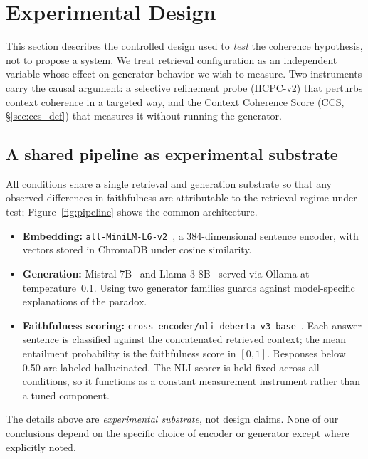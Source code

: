 \section{Experimental Design}
\label{sec:method}

This section describes the controlled design used to \emph{test} the
coherence hypothesis, not to propose a system. We treat retrieval
configuration as an independent variable whose effect on generator
behavior we wish to measure. Two instruments carry the causal argument:
a selective refinement probe (HCPC-v2) that perturbs context coherence
in a targeted way, and the Context Coherence Score (CCS,
\S\ref{sec:ccs_def}) that measures it without running the generator.

\subsection{A shared pipeline as experimental substrate}
\label{sec:shared}


All conditions share a single retrieval and generation substrate so that
any observed differences in faithfulness are attributable to the retrieval
regime under test; Figure~\ref{fig:pipeline} shows the common architecture.

\begin{itemize}
  \item \textbf{Embedding:}
        \texttt{all-MiniLM-L6-v2}~\citep{reimers2019sbert}, a 384-dimensional
        sentence encoder, with vectors stored in ChromaDB under cosine
        similarity.
  \item \textbf{Generation:} Mistral-7B~\citep{jiang2023mistral} and
        Llama-3-8B~\citep{llama3} served via Ollama at temperature~0.1.
        Using two generator families guards against model-specific
        explanations of the paradox.
  \item \textbf{Faithfulness scoring:}
        \texttt{cross-encoder/nli-deberta-v3-base}~\citep{he2021deberta}.
        Each answer sentence is classified against the concatenated
        retrieved context; the mean entailment probability is the
        faithfulness score in $[0,1]$. Responses below 0.50 are labeled
        hallucinated. The NLI scorer is held fixed across all conditions,
        so it functions as a constant measurement instrument rather than a
        tuned component.
\end{itemize}

The details above are \emph{experimental substrate}, not design claims.
None of our conclusions depend on the specific choice of encoder or
generator except where explicitly noted.

